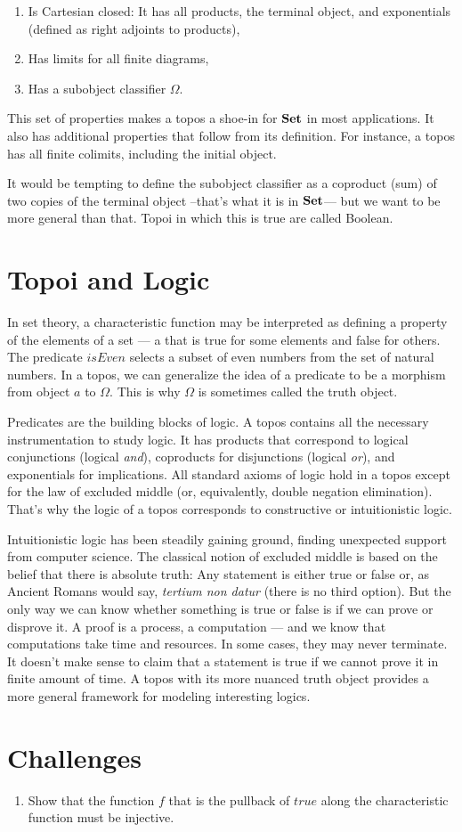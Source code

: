 \begin{enumerate}
	\tightlist
	\item
	      Is Cartesian closed: It has all products, the terminal object, and
	      exponentials (defined as right adjoints to products),
	\item
	      Has limits for all finite diagrams,
	\item
	      Has a subobject classifier $\Omega$.
\end{enumerate}

This set of properties makes a topos a shoe-in for $\mathbf{Set}$ in most
applications. It also has additional properties that follow from its
definition. For instance, a topos has all finite colimits, including the
initial object.

It would be tempting to define the subobject classifier as a coproduct
(sum) of two copies of the terminal object --that's what it is in
$\mathbf{Set}$--- but we want to be more general than that. Topoi in which
this is true are called Boolean.

\section{Topoi and Logic}

In set theory, a characteristic function may be interpreted as defining
a property of the elements of a set --- a  that is true
for some elements and false for others. The predicate $\mathit{isEven}$
selects a subset of even numbers from the set of natural numbers. In a
topos, we can generalize the idea of a predicate to be a morphism from
object $a$ to $\Omega$. This is why $\Omega$ is sometimes
called the truth object.

Predicates are the building blocks of logic. A topos contains all the
necessary instrumentation to study logic. It has products that
correspond to logical conjunctions (logical \emph{and}), coproducts for
disjunctions (logical \emph{or}), and exponentials for implications. All
standard axioms of logic hold in a topos except for the law of excluded
middle (or, equivalently, double negation elimination). That's why the
logic of a topos corresponds to constructive or intuitionistic logic.

Intuitionistic logic has been steadily gaining ground, finding
unexpected support from computer science. The classical notion of
excluded middle is based on the belief that there is absolute truth: Any
statement is either true or false or, as Ancient Romans would say,
\emph{tertium non datur} (there is no third option). But the only way we
can know whether something is true or false is if we can prove or
disprove it. A proof is a process, a computation --- and we know that
computations take time and resources. In some cases, they may never
terminate. It doesn't make sense to claim that a statement is true if we
cannot prove it in finite amount of time. A topos with its more nuanced
truth object provides a more general framework for modeling interesting
logics.

\section{Challenges}

\begin{enumerate}
	\tightlist
	\item
	      Show that the function $f$ that is the pullback of
	      $\mathit{true}$ along the characteristic function must be injective.
\end{enumerate}
